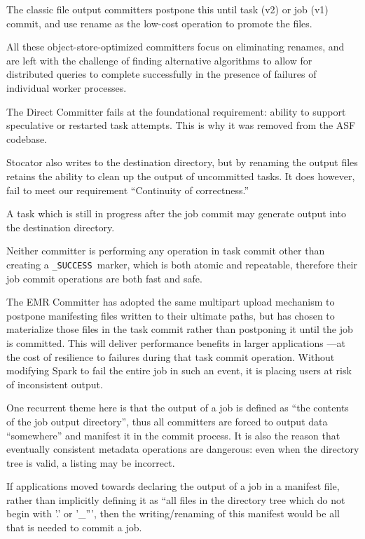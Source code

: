 \documentclass[conference]{IEEEtran}
\newcommand{\SUCCESS}{\texttt{\_SUCCESS}\ }
\begin{document}
The classic file output committers postpone this until task (v2) or job (v1)
commit, and use rename as the low-cost operation to promote the files.

All these object-store-optimized committers focus on eliminating renames,
and are left with the challenge of finding alternative algorithms to
allow for distributed queries to complete successfully in the presence
of failures of individual worker processes.


The Direct Committer fails at the foundational requirement: ability to support
speculative or restarted task attempts.
This is why it was removed from the ASF codebase.

Stocator also writes to the destination directory, but by renaming the output
files retains the ability to clean up the output of uncommitted tasks.
It does however, fail to meet our requirement ``Continuity of correctness.''

A task which is still in progress after the job commit may generate output
into the destination directory.

Neither committer is performing any operation in task commit other than creating
a \SUCCESS marker, which is both atomic and repeatable, therefore their job commit
operations are both fast and safe.

The EMR Committer has adopted the same multipart upload mechanism to postpone
manifesting files written to their ultimate paths, but has chosen to materialize
those files in the task commit rather than postponing it until the job is committed.
This will deliver performance benefits in larger applications ---at the cost
of resilience to failures during that task commit operation.
Without modifying Spark to fail the entire job in such an event, it is placing
users at risk of inconsistent output.


One recurrent theme here is that the output of a job is defined as
``the contents of the job output directory'', thus all committers are
forced to output data ``somewhere'' and manifest it in the commit process.
It is also the reason that eventually consistent metadata operations are
dangerous: even when the directory tree is valid, a listing may be incorrect.

If applications moved towards declaring the output of a job in
a manifest file, rather than implicitly defining it as ``all files in the directory
tree which do not begin with '.' or '\_''', then the writing/renaming
of this manifest would be all that is needed to commit a job.
\end{document}
